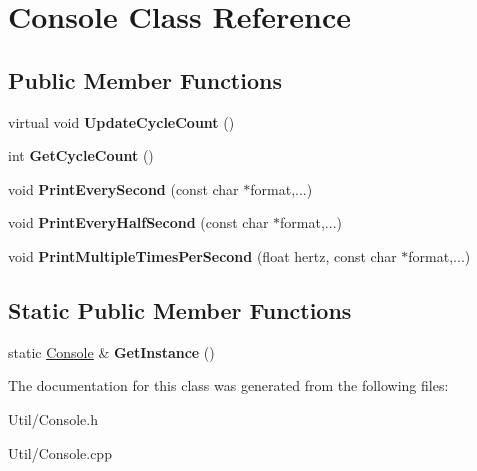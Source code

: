 \hypertarget{class_console}{
\section{\-Console \-Class \-Reference}
\label{class_console}
}
\subsection*{\-Public \-Member \-Functions}
\begin{DoxyCompactItemize}
\item 
\hypertarget{class_console_a25b10a54442e1372deee3c2b54fbfadd}{
virtual void {\bfseries \-Update\-Cycle\-Count} ()}
\label{class_console_a25b10a54442e1372deee3c2b54fbfadd}

\item 
\hypertarget{class_console_a7f2f28853a12ad15fecc6efc0580a583}{
int {\bfseries \-Get\-Cycle\-Count} ()}
\label{class_console_a7f2f28853a12ad15fecc6efc0580a583}

\item 
\hypertarget{class_console_a6ff6891ea662984db70084187965280a}{
void {\bfseries \-Print\-Every\-Second} (const char $\ast$format,...)}
\label{class_console_a6ff6891ea662984db70084187965280a}

\item 
\hypertarget{class_console_a4e9c628cb3178632ab04a5588d8467fe}{
void {\bfseries \-Print\-Every\-Half\-Second} (const char $\ast$format,...)}
\label{class_console_a4e9c628cb3178632ab04a5588d8467fe}

\item 
\hypertarget{class_console_a48d9e27150ad93dd8239eef9da0c5254}{
void {\bfseries \-Print\-Multiple\-Times\-Per\-Second} (float hertz, const char $\ast$format,...)}
\label{class_console_a48d9e27150ad93dd8239eef9da0c5254}

\end{DoxyCompactItemize}
\subsection*{\-Static \-Public \-Member \-Functions}
\begin{DoxyCompactItemize}
\item 
\hypertarget{class_console_a61d2bbd3b427702716e27a579f97d85a}{
static \hyperlink{class_console}{\-Console} \& {\bfseries \-Get\-Instance} ()}
\label{class_console_a61d2bbd3b427702716e27a579f97d85a}

\end{DoxyCompactItemize}


\-The documentation for this class was generated from the following files\-:\begin{DoxyCompactItemize}
\item 
\-Util/\-Console.\-h\item 
\-Util/\-Console.\-cpp\end{DoxyCompactItemize}
